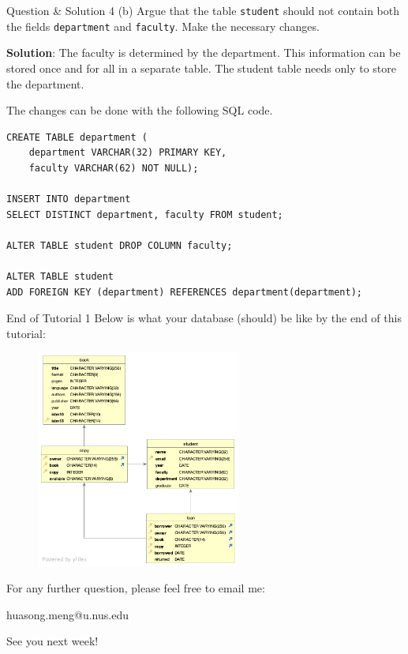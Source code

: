 \begin{frame}[fragile]{Question \& Solution 4 (b)}
Argue that the table \texttt{student} should not contain both the fields \texttt{department} and \texttt{faculty}. Make the necessary changes. \vspace{10pt}

\textbf{Solution}:
The faculty is determined by the department. This information can be stored once and for all in a separate table. The student table needs only to store the department. \vspace{10pt}

The changes can be done with the following SQL code.

\begin{lstlisting}
CREATE TABLE department (
	department VARCHAR(32) PRIMARY KEY,
	faculty VARCHAR(62) NOT NULL);

INSERT INTO department 
SELECT DISTINCT department, faculty FROM student;

ALTER TABLE student DROP COLUMN faculty;

ALTER TABLE student
ADD FOREIGN KEY (department) REFERENCES department(department);
\end{lstlisting}
\end{frame}


\begin{frame}[fragile]{End of Tutorial 1}
	Below is what your database (should) be like by the end of this tutorial:
	
	\begin{figure}
		\includegraphics[width=0.6\textwidth]{t1/images/t1-0.png}
	\end{figure}
\end{frame}

\begin{frame}{}
\centering  
For any further question, please feel free to email me:\vspace{10pt}

huasong.meng@u.nus.edu \vspace{20pt}

See you next week!
\end{frame}